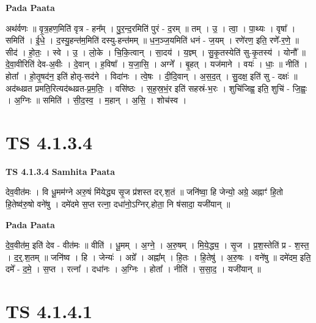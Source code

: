 \documentclass[17pt]{extarticle}
\begin{document}
\textbf{Pada Paata} \newline

अथ॑र्वणः ॥ वृ॒त्र॒हण॒मिति॑ वृत्र - हन᳚म् । पु॒र॒न्द॒रमिति॑ पुरं - द॒रम् ॥ तम् । उ॒ । त्वा॒ । पा॒थ्यः । वृषा᳚ । समिति॑ । ई॒धे॒ । द॒स्यु॒हन्त॑म॒मिति॑ दस्यु-हन्त॑मम् ॥ ध॒न॒ञ्ज॒यमिति॑ धनं - ज॒यम् । रणे॑रण॒ इति॒ रणे᳚-र॒णे॒ ॥ सीद॑ । हो॒तः॒ । स्वे । उ॒ । लो॒के । चि॒कि॒त्वान् । सा॒दय॑ । य॒ज्ञ्म् । सु॒कृ॒तस्येति॑ सु-कृ॒तस्य॑ । योनौ᳚ ॥ दे॒वा॒वीरिति॑ देव-अ॒वीः । दे॒वान् । ह॒विषा᳚ । य॒जा॒सि॒ । अग्ने᳚ । बृ॒हत् । यज॑माने । वयः॑ । धाः॒ ॥ नीति॑ । होता᳚ । हो॒तृ॒षद॑न॒ इति॑ होतृ-सद॑ने । विदा॑नः । त्वे॒षः । दी॒दि॒वान् । अ॒स॒द॒त् । सु॒दक्ष॒ इति॑ सु - दक्षः॑ ॥ अद॑ब्धव्रत प्रमति॒रित्यद॑ब्धव्रत-प्र॒म॒तिः॒ । वसि॑ष्ठः । स॒ह॒स्र॒भं॒र इति॑ सहस्रं-भ॒रः । शुचि॑जिह्व॒ इति॒ शुचि॑ - जि॒ह्वः॒ । अ॒ग्निः ॥ समिति॑ । सी॒द॒स्व॒ । म॒हान् । अ॒सि॒ । शोच॑स्व ।  \newline





\section{ TS 4.1.3.4 }

\textbf{TS 4.1.3.4 } \newline
\textbf{Samhita Paata} \newline

देव॒वीत॑मः । वि धू॒मम॑ग्ने अरु॒षं मि॑येद्ध्य सृ॒ज प्र॑शस्त दर्.श॒तं ॥ जनि॑ष्वा॒ हि जेन्यो॒ अग्रे॒ अह्नाꣳ॑ हि॒तो हि॒तेष्व॑रु॒षो वने॑षु । दमे॑दमे स॒प्त रत्ना॒ दधा॑नो॒ऽग्निर्.होता॒ नि ष॑सादा॒ यजी॑यान् ॥ \newline

\textbf{Pada Paata} \newline

दे॒व॒वीत॑म॒ इति॑ देव - वीत॑मः ॥ वीति॑ । धू॒मम् । अ॒ग्ने॒ । अ॒रु॒षम् । मि॒ये॒द्ध्य॒ । सृ॒ज । प्र॒श॒स्तेति॑ प्र - श॒स्त॒ । द॒र्॒.श॒तम् ॥ जनि॑ष्व । हि । जेन्यः॑ । अग्रे᳚ । अह्ना᳚म् । हि॒तः । हि॒तेषु॑ । अ॒रु॒षः । वने॑षु ॥ दमे॑दम॒ इति॒ दमे᳚ - द॒मे॒ । स॒प्त । रत्ना᳚ । दधा॑नः । अ॒ग्निः । होता᳚ । नीति॑ । स॒सा॒द॒ । यजी॑यान् ॥  \newline





\section{ TS 4.1.4.1 }
\end{document}
